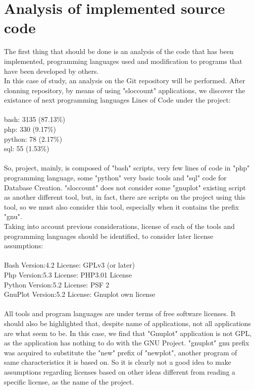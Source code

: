 \documentclass[11pt]{article}
\begin{document}
\section{Analysis of implemented source code}

The first thing that should be done is an analysis of the code that has been implemented, programming languages used and modification to programs that have been developed by others.\\
In this case of study, an analysis on the Git repository will be performed. After clonning repository, by means of using "sloccount" applications, we discover the existance of next programming languages Lines of Code under the project:\\
\\
bash:            3135 (87.13\%)\\
php:              330 (9.17\%)\\
python:            78 (2.17\%)\\
sql:               55 (1.53\%)\\
\\
So, project, mainly, is composed of "bash" scripts, very few lines of code in "php" programming language, some "python" very basic tools and "sql" code for Database Creation. "sloccount" does not consider some "gnuplot" existing script as another different tool,  but, in fact, there are scripts on the project using this tool, so we must also consider this tool, especially when it contains the prefix "gnu".\\
Taking into account previous considerations, license of each of the tools and programming languages should be identified, to consider later license assumptions:\\
\\
Bash    Version:4.2  License: GPLv3 (or later)\\
Php     Version:5.3  License: PHP3.01 License\\
Python  Version:5.2  License: PSF 2\\
GnuPlot Version:5.2  License: Gnuplot own license\\
\\
All tools and program languages are under terms of free software licenses. It should also be highlighted that, despite name of applications, not all applications are what seem to be. In this case, we find that "Gnuplot" application is not GPL, as the application has nothing to do with the GNU Project. "gnuplot" gnu prefix was acquired to substitute the "new" prefix of "newplot", another program of same characteristics it is based on. So it is clearly not a good idea to make assumptions regarding licenses based on other ideas different from reading a specific license, as the name of the project.\\
\end{document}
